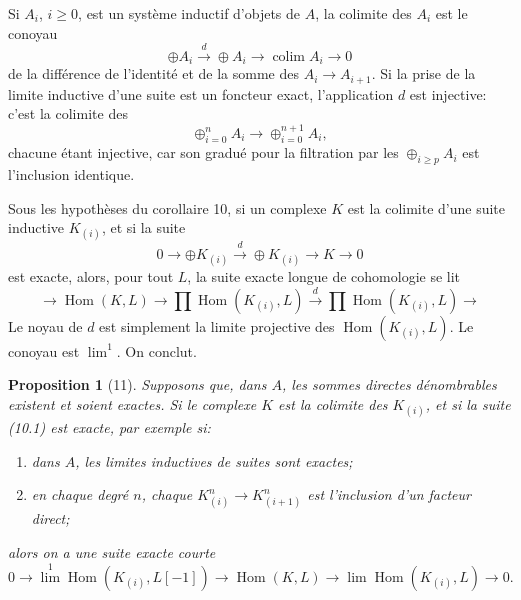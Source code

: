 \documentclass[11pt]{article}
\newcommand{\Hom}{\operatorname{Hom}}
\theoremstyle{deligne}
\newtheorem*{proposition*}{Proposition}
\begin{document}
Si \(A_i\), \(i\ge0\), est un système inductif d'objets de \(A\), la colimite des \(A_i\) est le conoyau
\[
\oplus A_i\overset{d}{\longrightarrow}\oplus A_i\longrightarrow \operatorname{colim}A_i\longrightarrow0
\]
de la différence de l'identité et de la somme des \(A_i\to A_{i+1}\). Si la prise de la limite inductive d'une suite est un foncteur exact, l'application \(d\) est injective: c'est la colimite des
\[
\oplus_{i=0}^n A_i\longrightarrow \oplus_{i=0}^{n+1}A_i,
\]
chacune étant injective, car son gradué pour la filtration par les \(\oplus_{i\ge p}A_i\) est l'inclusion identique.

Sous les hypothèses du corollaire 10, si un complexe \(K\) est la colimite d'une suite inductive \(K_{(i)}\), et si la suite
\[
0\longrightarrow\oplus K_{(i)}\overset{d}{\longrightarrow}\oplus K_{(i)}\longrightarrow K\longrightarrow0 \tag{10.1}
\]
est exacte, alors, pour tout \(L\), la suite exacte longue de cohomologie se lit
\[
\longrightarrow \Hom(K,L)\longrightarrow\prod\Hom(K_{(i)},L)
 \overset{d}{\longrightarrow}\prod\Hom(K_{(i)},L)\longrightarrow
\]
Le noyau de \(d\) est simplement la limite projective des \(\Hom(K_{(i)},L)\). Le conoyau est \(\operatorname{lim}^1\). On conclut.

\begin{proposition*}[11]
Supposons que, dans \(A\), les sommes directes dénombrables existent et soient exactes. Si le complexe \(K\) est la colimite des \(K_{(i)}\), et si la suite (10.1) est exacte, par exemple si:
\begin{enumerate}[label=\arabic*.]
\item dans \(A\), les limites inductives de suites sont exactes;
\item en chaque degré \(n\), chaque \(K^n_{(i)}\to K^n_{(i+1)}\) est l'inclusion d'un facteur direct;
\end{enumerate}
alors on a une suite exacte courte
\[
0\longrightarrow\operatorname{lim}^1\Hom(K_{(i)},L[-1])
\longrightarrow\Hom(K,L)
\longrightarrow\operatorname{lim}\Hom(K_{(i)},L)\longrightarrow0.
\]
\end{proposition*}
\end{document}

